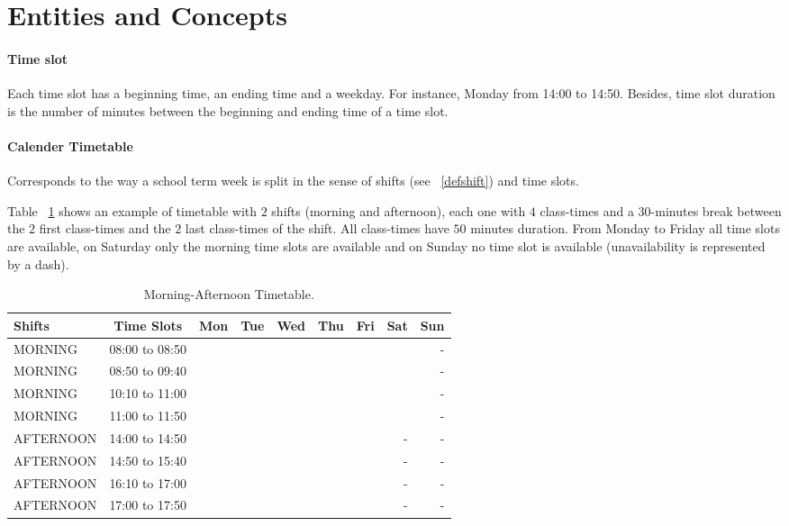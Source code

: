 \section{Entities and Concepts}
\label{sec:entities}


\paragraph{Time slot}
\label{deftimeslot}

Each time slot has a beginning time, an ending time and a weekday. For instance, Monday from 14:00 to 14:50. Besides, time slot duration is the number of minutes between the beginning and ending time of a time slot.


\paragraph{Calender Timetable}
\label{deftimetable}

Corresponds to the way a school term week is split in the sense of shifts (see ~\ref{defshift}) and time slots.

Table ~\ref{tab:calendarioMT} shows an example of timetable with $2$ shifts (morning and afternoon), each one with $4$ class-times and a 30-minutes break between the $2$ first class-times and the $2$ last class-times of the shift. All class-times have $50$ minutes duration. From Monday to Friday all time slots are available, on Saturday only the morning time slots are available and on Sunday no time slot is available (unavailability is represented by a dash).

\begin{table}[H]
\centering
\begin{tabular}{l|c|r|r|r|r|r|r|r}
Shifts & Time Slots & Mon & Tue & Wed & Thu & Fri & Sat & Sun \\\hline
MORNING & 08:00 to 08:50 & & & & & & & - \\
MORNING & 08:50 to 09:40 & & & & & & & - \\
MORNING & 10:10 to 11:00 & & & & & & & - \\
MORNING & 11:00 to 11:50 & & & & & & & - \\
AFTERNOON & 14:00 to 14:50 & & & & & & - & - \\
AFTERNOON & 14:50 to 15:40 & & & & & & - & - \\
AFTERNOON & 16:10 to 17:00 & & & & & & - & - \\
AFTERNOON & 17:00 to 17:50 & & & & & & - & -
\end{tabular}
\caption{\label{tab:calendarioMT}Morning-Afternoon Timetable.}
\end{table}

